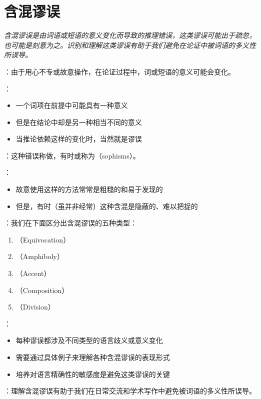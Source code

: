 \section{含混谬误}

\begin{logicbox}[title=引言]
\textit{含混谬误是由词语或短语的意义变化而导致的推理错误，这类谬误可能出于疏忽，也可能是刻意为之。识别和理解这类谬误有助于我们避免在论证中被词语的多义性所误导。}
\end{logicbox}

\begin{theorembox}[title=含混谬误的本质特征]
：由于用心不专或故意操作，在论证过程中，词或短语的意义可能会变化。

：
\begin{itemize}
  \item 一个词项在前提中可能具有一种意义
  \item 但是在结论中却是另一种相当不同的意义
  \item 当推论依赖这样的变化时，当然就是谬误
\end{itemize}

：这种错误称做，有时或称为（sophisms）。

：
\begin{itemize}
  \item 故意使用这样的方法常常是粗糙的和易于发现的
  \item 但是，有时（虽并非经常）这种含混是隐蔽的、难以把捉的
\end{itemize}
\end{theorembox}

\begin{theorembox}[title=含混谬误的五种主要类型]
：我们在下面区分出含混谬误的五种类型：

\begin{enumerate}
  \item {}（Equivocation）
  \item {}（Amphiboly）
  \item {}（Accent）
  \item {}（Composition）
  \item {}（Division）
\end{enumerate}

：
\begin{itemize}
  \item 每种谬误都涉及不同类型的语言歧义或意义变化
  \item 需要通过具体例子来理解各种含混谬误的表现形式
  \item 培养对语言精确性的敏感度是避免这类谬误的关键
\end{itemize}

：理解含混谬误有助于我们在日常交流和学术写作中避免被词语的多义性所误导。
\end{theorembox}